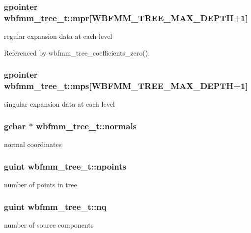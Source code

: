 \subsubsection[{mpr}]{\setlength{\rightskip}{0pt plus 5cm}gpointer wbfmm\+\_\+tree\+\_\+t\+::mpr[W\+B\+F\+M\+M\+\_\+\+T\+R\+E\+E\+\_\+\+M\+A\+X\+\_\+\+D\+E\+P\+T\+H+1]}\label{structwbfmm__tree__t_a466a0bd76fd6539f493ce257df47dfad}
regular expansion data at each level 

Referenced by wbfmm\+\_\+tree\+\_\+coefficients\+\_\+zero().

\subsubsection[{mps}]{\setlength{\rightskip}{0pt plus 5cm}gpointer wbfmm\+\_\+tree\+\_\+t\+::mps[W\+B\+F\+M\+M\+\_\+\+T\+R\+E\+E\+\_\+\+M\+A\+X\+\_\+\+D\+E\+P\+T\+H+1]}\label{structwbfmm__tree__t_abea428ae644531258ba6d138ad727d29}
singular expansion data at each level 
\subsubsection[{normals}]{\setlength{\rightskip}{0pt plus 5cm}gchar $\ast$ wbfmm\+\_\+tree\+\_\+t\+::normals}\label{structwbfmm__tree__t_aaf95aaece28a4f1b4c89e504af4cfa76}
normal coordinates 
\subsubsection[{npoints}]{\setlength{\rightskip}{0pt plus 5cm}guint wbfmm\+\_\+tree\+\_\+t\+::npoints}\label{structwbfmm__tree__t_a05dd3977f0f6f9266dfe5b4de1fd94ea}
number of points in tree 
\subsubsection[{nq}]{\setlength{\rightskip}{0pt plus 5cm}guint wbfmm\+\_\+tree\+\_\+t\+::nq}\label{structwbfmm__tree__t_a4201af7a54bb9d81e588ab619cecabbd}
number of source components 


